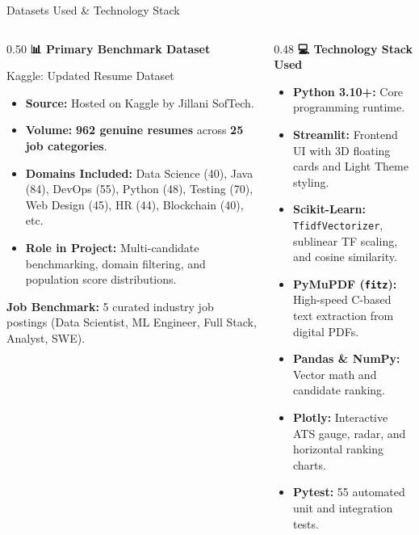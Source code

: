 \documentclass[aspectratio=169, 10pt]{beamer}
\begin{document}
\begin{frame}{Datasets Used \& Technology Stack}
  \small
  \begin{columns}[T]
    \begin{column}{0.50\textwidth}
      \textbf{\large 📊 Primary Benchmark Dataset}
      \begin{block}{Kaggle: Updated Resume Dataset}
        \begin{itemize}
          \item \textbf{Source:} Hosted on Kaggle by Jillani SofTech.
          \item \textbf{Volume:} \textbf{962 genuine resumes} across \textbf{25 job categories}.
          \item \textbf{Domains Included:} Data Science (40), Java (84), DevOps (55), Python (48), Testing (70), Web Design (45), HR (44), Blockchain (40), etc.
          \item \textbf{Role in Project:} Multi-candidate benchmarking, domain filtering, and population score distributions.
        \end{itemize}
      \end{block}
      \textbf{Job Benchmark:} 5 curated industry job postings (Data Scientist, ML Engineer, Full Stack, Analyst, SWE).
    \end{column}

    \begin{column}{0.48\textwidth}
      \textbf{\large 💻 Technology Stack Used}
      \begin{itemize}
        \item \textbf{Python 3.10+:} Core programming runtime.
        \item \textbf{Streamlit:} Frontend UI with 3D floating cards and Light Theme styling.
        \item \textbf{Scikit-Learn:} \texttt{TfidfVectorizer}, sublinear TF scaling, and cosine similarity.
        \item \textbf{PyMuPDF (\texttt{fitz}):} High-speed C-based text extraction from digital PDFs.
        \item \textbf{Pandas \& NumPy:} Vector math and candidate ranking.
        \item \textbf{Plotly:} Interactive ATS gauge, radar, and horizontal ranking charts.
        \item \textbf{Pytest:} 55 automated unit and integration tests.
      \end{itemize}
    \end{column}
  \end{columns}
\end{frame}
\end{document}
